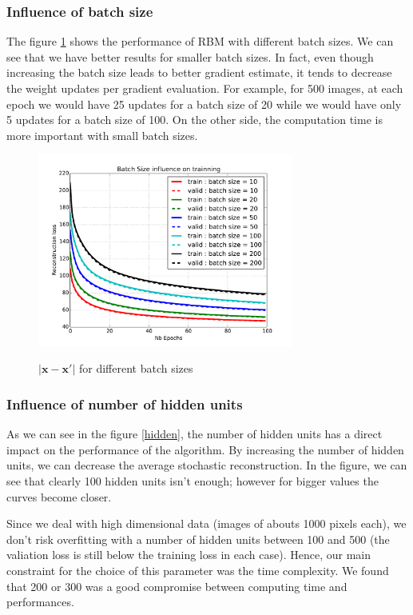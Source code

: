 \documentclass{article}
\begin{document}
\subsubsection{Influence of batch size}

The figure \ref{batch} shows the performance of RBM with different batch sizes. We can see that we have better results for smaller batch sizes. In fact, even though increasing the batch size leads to better gradient estimate, it tends to decrease the weight updates per gradient evaluation. For example, for 500 images, at each epoch we would have 25 updates for a batch size of 20 while we would have only 5 updates for a batch size of 100. On the other side, the computation time is more important with small batch sizes.

\begin{figure}
\centering
\includegraphics[width=0.75\textwidth]{batchsize}
\label{batch}
\caption{$\lvert \mathbf{x} - \mathbf{x'} \rvert$ for different batch sizes}
\end{figure}

\subsubsection{Influence of number of hidden units}

As we can see in the figure \ref{hidden}, the number of hidden units has a direct impact on the performance of the algorithm. By increasing the number of hidden units, we can decrease the average stochastic reconstruction. In the figure, we can see that clearly 100 hidden units isn't enough; however for bigger values the curves become closer. 

Since we deal with high dimensional data (images of abouts 1000 pixels each), we don't risk overfitting with a number of hidden units between 100 and 500 (the valiation loss is still below the training loss in each case). Hence, our main constraint for the choice of this parameter was the time complexity. We found that 200 or 300 was a good compromise between computing time and performances.
\end{document}
